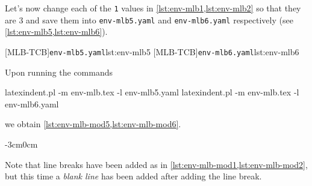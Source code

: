 \documentclass[10pt]{article}
\newenvironment{widepage}{\begin{adjustwidth}{-3cm}{0cm}}{\end{adjustwidth}}
\begin{document}
  \begin{example}
  Let's now change each of the \texttt{1} values in \cref{lst:env-mlb1,lst:env-mlb2} so
  that they are $3$ and save them into \texttt{env-mlb5.yaml} and \texttt{env-mlb6.yaml}
  respectively (see \cref{lst:env-mlb5,lst:env-mlb6}). %

  \begin{cmhtcbraster}
   [MLB-TCB]{\texttt{env-mlb5.yaml}}{lst:env-mlb5}
   [MLB-TCB]{\texttt{env-mlb6.yaml}}{lst:env-mlb6}
  \end{cmhtcbraster}

  Upon running the commands

  \begin{commandshell}
latexindent.pl -m env-mlb.tex -l env-mlb5.yaml
latexindent.pl -m env-mlb.tex -l env-mlb6.yaml
\end{commandshell}

  we obtain \cref{lst:env-mlb-mod5,lst:env-mlb-mod6}.

  \begin{widepage}
   \begin{minipage}{.56\linewidth}
   \end{minipage}
   \hfill
   \begin{minipage}{.43\linewidth}
   \end{minipage}
  \end{widepage}

  Note that line breaks have been added as in \cref{lst:env-mlb-mod1,lst:env-mlb-mod2},
  but this time a \emph{blank line} has been added after adding the line break.
  \end{example}
\end{document}

